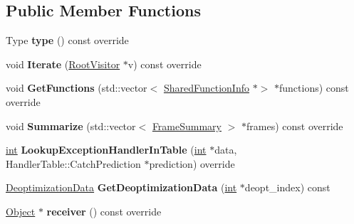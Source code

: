 \subsection*{Public Member Functions}
\begin{DoxyCompactItemize}
\item 
\mbox{\label{classv8_1_1internal_1_1OptimizedFrame_a064a608fb7fdf2ae985cdf17dae2f2af}} 
Type {\bfseries type} () const override
\item 
\mbox{\label{classv8_1_1internal_1_1OptimizedFrame_ac21dea56cb97c5d1fed4ad0293199052}} 
void {\bfseries Iterate} (\mbox{\hyperlink{classv8_1_1internal_1_1RootVisitor}{Root\+Visitor}} $\ast$v) const override
\item 
\mbox{\label{classv8_1_1internal_1_1OptimizedFrame_a10eb1d2f9d6857408bd7c88670ead87d}} 
void {\bfseries Get\+Functions} (std\+::vector$<$ \mbox{\hyperlink{classv8_1_1internal_1_1SharedFunctionInfo}{Shared\+Function\+Info}} $\ast$$>$ $\ast$functions) const override
\item 
\mbox{\label{classv8_1_1internal_1_1OptimizedFrame_a1fb6523e46c50d55377be381a905046f}} 
void {\bfseries Summarize} (std\+::vector$<$ \mbox{\hyperlink{classv8_1_1internal_1_1FrameSummary}{Frame\+Summary}} $>$ $\ast$frames) const override
\item 
\mbox{\label{classv8_1_1internal_1_1OptimizedFrame_aab3a9c1c4cbdec62a14f3c6ded471dd6}} 
\mbox{\hyperlink{classint}{int}} {\bfseries Lookup\+Exception\+Handler\+In\+Table} (\mbox{\hyperlink{classint}{int}} $\ast$data, Handler\+Table\+::\+Catch\+Prediction $\ast$prediction) override
\item 
\mbox{\label{classv8_1_1internal_1_1OptimizedFrame_a244dc405c7404f0876e96e5f895d9c3a}} 
\mbox{\hyperlink{classv8_1_1internal_1_1DeoptimizationData}{Deoptimization\+Data}} {\bfseries Get\+Deoptimization\+Data} (\mbox{\hyperlink{classint}{int}} $\ast$deopt\+\_\+index) const
\item 
\mbox{\label{classv8_1_1internal_1_1OptimizedFrame_ae8b06031671cce6a56ddeb82e1894ca7}} 
\mbox{\hyperlink{classv8_1_1internal_1_1Object}{Object}} $\ast$ {\bfseries receiver} () const override
\end{DoxyCompactItemize}
